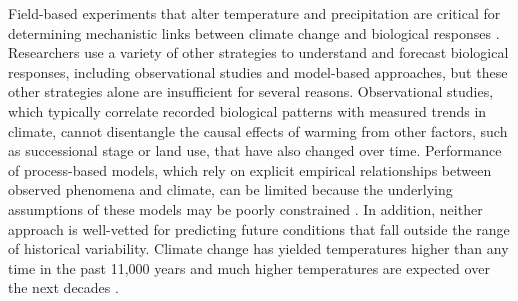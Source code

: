 \documentclass{article}
\begin{document}

\par Field-based experiments that alter temperature and precipitation are critical for determining mechanistic links between climate change and biological responses \citep[e.g.,][]{box1978,williams2007,gelman2014}. Researchers use a variety of other strategies to understand and forecast biological responses, including observational studies and model-based approaches, but these other strategies alone are insufficient for several reasons. Observational studies, which typically correlate recorded biological patterns with measured trends in climate, cannot disentangle the causal effects of warming from other factors, such as successional stage or land use, that have also changed over time. Performance of process-based models, which rely on explicit empirical relationships between observed phenomena and climate, can be limited because the underlying assumptions of these models may be poorly constrained \citep [e.g.,][]{pearson2004,ibanez2006,swab2012,chuine2016}. 
In addition, neither approach is well-vetted for predicting future conditions that fall outside the range of historical variability. Climate change has yielded temperatures higher than any time in the past 11,000 years and much higher temperatures are expected over the next decades \citep{ohlemuller2006,williams2007,williams2007b,ipcc2013}.  %
\end{document}
